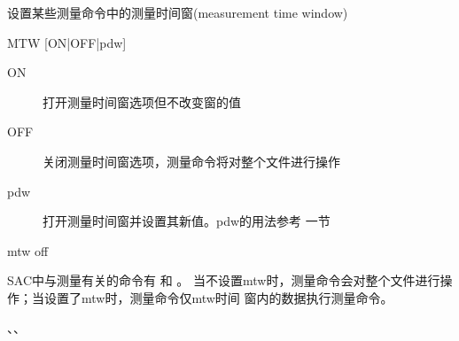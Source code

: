 \label{cmd:mtw}

设置某些测量命令中的测量时间窗(measurement time window)

\begin{SACSTX}
MTW [ON|OFF|pdw]
\end{SACSTX}

\begin{description}
\item [ON] 打开测量时间窗选项但不改变窗的值
\item [OFF] 关闭测量时间窗选项，测量命令将对整个文件进行操作
\item [pdw] 打开测量时间窗并设置其新值。pdw的用法参考  一节
\end{description}

\begin{SACDFT}
mtw off
\end{SACDFT}

SAC中与测量有关的命令有  和  。
当不设置mtw时，测量命令会对整个文件进行操作；当设置了mtw时，测量命令仅mtw时间
窗内的数据执行测量命令。

、、
